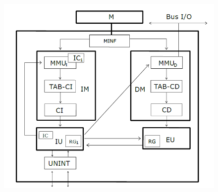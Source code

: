 \begin{figure}[H]
    \centering
    \includegraphics[width=\textwidth]{immagini/Architettura_pipeline.png}
\end{figure}
